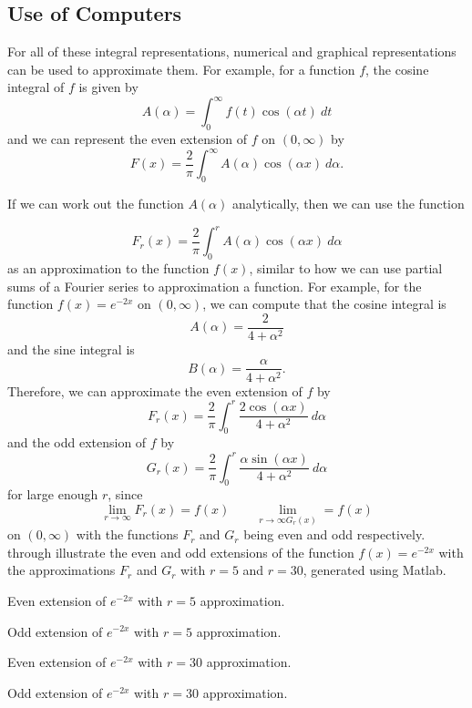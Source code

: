 \documentclass{ximera}
\begin{document}
\subsection{Use of Computers}

For all of these integral representations, numerical and graphical representations can be used to approximate them. For example, for a function $f$, the cosine integral of $f$ is given by 
\[ 
    A(\alpha) = \int_0^\infty f(t) \cos(\alpha t)\ dt 
\] 
and we can represent the even extension of $f$ on $(0, \infty)$ by
\[ 
    F(x) = \frac{2}{\pi} \int_{0}^\infty A(\alpha) \cos(\alpha x)\ d\alpha. 
\]

If we can work out the function $A(\alpha)$ analytically, then we can use the function

\[ 
    F_r(x) = \frac{2}{\pi} \int_0^r A(\alpha)\cos(\alpha x)\ d\alpha 
\] 
as an approximation to the function $f(x)$, similar to how we can use partial sums of a Fourier series to approximation a function. For example, for the function $f(x) = e^{-2x}$ on $(0, \infty)$, we can compute that the cosine integral is
\[ 
    A(\alpha) = \frac{2}{4+\alpha^2} 
\] 
and the sine integral is 
\[ 
    B(\alpha) = \frac{\alpha}{4+\alpha^2}.
\] 
Therefore, we can approximate the even extension of $f$ by 
\[ 
    F_r(x) = \frac{2}{\pi} \int_0^r \frac{2 \cos(\alpha x)}{4+\alpha^2}\ d\alpha 
\] 
and the odd extension of $f$ by
\[ 
    G_r(x) = \frac{2}{\pi} \int_0^r \frac{\alpha \sin(\alpha x)}{4 + \alpha^2}\ d\alpha 
\] 
for large enough $r$, since 
\[ 
    \lim_{r\rightarrow \infty} F_r(x) = f(x) \qquad \lim_{r\rightarrow \infty G_r(x)} = f(x) 
\] 
on $(0,\infty)$ with the functions $F_r$ and $G_r$ being even and odd respectively.  through  illustrate the even and odd extensions of the function $f(x) = e^{-2x}$ with the approximations $F_r$ and $G_r$ with $r=5$ and $r=30$, generated using Matlab. 

\begin{myfig}
    \parbox[t]{2.5in}{
        \capstart%
        \caption{Even extension of $e^{-2x}$ with $r=5$ approximation. \label{fig:even5Graph}} 
        } \quad \qquad
    \parbox[t]{2.5in}{ 
        \capstart
        \caption{Odd extension of $e^{-2x}$ with $r=5$ approximation.\label{fig:odd5Graph}}
        }
\end{myfig}

\begin{myfig}
    \parbox[t]{2.5in}{
        \capstart%
        \caption{Even extension of $e^{-2x}$ with $r=30$ approximation. \label{fig:even30Graph}} 
        } \quad \qquad
    \parbox[t]{2.5in}{ 
        \capstart
        \caption{Odd extension of $e^{-2x}$ with $r=30$ approximation.\label{fig:odd30Graph}}
        }
\end{myfig}
\end{document}
